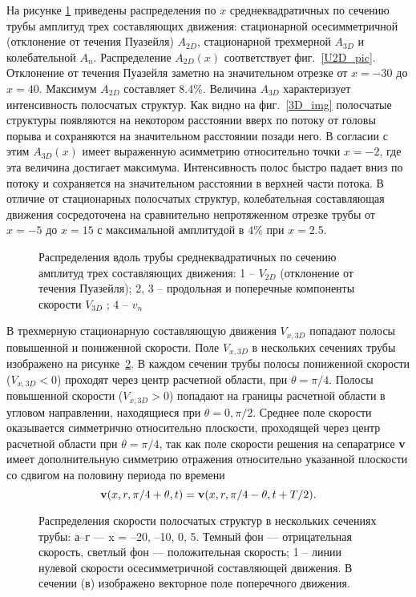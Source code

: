 На рисунке \ref{amp_pic} приведены распределения по $x$ среднеквадратичных по сечению трубы амплитуд трех составляющих движения: стационарной осесимметричной (отклонение от течения Пуазейля) $A_{2D}$, стационарной трехмерной $A_{3D}$ и колебательной $A_n$. Распределение $A_{2D}(x)$ соответствует фиг.~\ref{U2D_pic}. Отклонение от течения Пуазейля заметно на значительном отрезке от $x=-30$ до $x=40$. Максимум $A_{2D}$ составляет 8.4\%. Величина $A_{3D}$ характеризует интенсивность полосчатых структур. Как видно на фиг.~\ref{3D_img} полосчатые структуры появляются на некотором расстоянии вверх по потоку от головы порыва и сохраняются на значительном расстоянии позади него. В согласии с этим $A_{3D}(x)$ имеет выраженную асимметрию относительно точки $x=-2$, где эта величина достигает максимума. Интенсивность полос быстро падает вниз по потоку и сохраняется на значительном расстоянии в верхней части потока. В отличие от стационарных полосчатых структур, колебательная составляющая движения сосредоточена на сравнительно непротяженном отрезке трубы от $x=-5$ до $x=15$ с максимальной амплитудой в 4\% при $x=2.5$.

\begin{figure}[h]
\caption{Распределения вдоль трубы среднеквадратичных по сечению амплитуд трех
составляющих движения: 1 – $V_{2D}$ (отклонение от течения Пуазейля); 2, 3 – продольная и поперечные компоненты скорости $V_{3D}$ ; 4 – $v_{n}$}
\label{amp_pic}
\end{figure}


В трехмерную стационарную составляющую движения $V_{x,3D}$ попадают полосы повышенной и пониженной скорости. Поле $V_{x,3D}$ в нескольких сечениях трубы изображено на рисунке~\ref{V3D_cs_pic}. В каждом сечении трубы полосы пониженной скорости ($V_{x,3D} < 0$) проходят через центр расчетной области, при $\theta = \pi/4$. Полосы повышенной скорости ($V_{x,3D} > 0$) попадают на границы расчетной области в угловом направлении, находящиеся при $\theta = 0, \pi/2$. Среднее поле скорости оказывается симметрично относительно плоскости, проходящей через центр расчетной области при $\theta = \pi/4$, так как поле скорости решения на сепаратрисе $\mathbf{v}$ имеет дополнительную симметрию отражения относительно указанной плоскости со сдвигом на половину периода по времени
\begin{equation}
\mathbf{v}(x, r, \pi/4 + \theta, t) = \mathbf{v}(x, r, \pi/4 - \theta, t + T/2). 
\end{equation} 


\begin{figure}[h]
\caption{Распределения скорости полосчатых структур в нескольких сечениях трубы:
а–г --- x = –20, –10, 0, 5. Темный фон --- отрицательная скорость, светлый фон --- положительная скорость; 1 – линии нулевой скорости осесимметричной составляющей движения. В сечении (в) изображено векторное поле поперечного движения.}
\label{V3D_cs_pic}
\end{figure}

